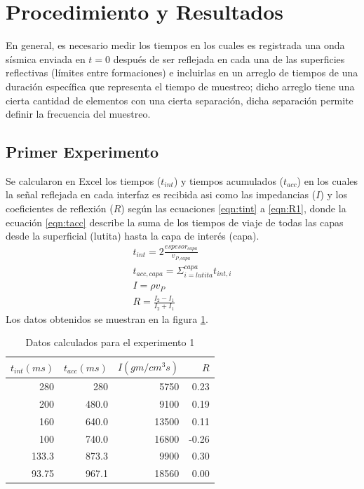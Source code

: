 \documentclass[%
 aip,
 jmp,%
 amsmath,amssymb,
 reprint,%
]{revtex4-1}
\begin{document}
\section{Procedimiento y Resultados}

En general, es necesario medir los tiempos en los cuales es registrada una onda sísmica enviada en $t=0$ después de ser reflejada en cada una de las superficies reflectivas (límites entre formaciones) e incluirlas en un arreglo de tiempos de una duración específica que representa el tiempo de muestreo; dicho arreglo tiene una cierta cantidad de elementos con una cierta separación, dicha separación permite definir la frecuencia del muestreo.

\subsection{Primer Experimento}
Se calcularon en Excel los tiempos ($t_{int}$) y tiempos acumulados ($t_{acc}$) en los cuales la señal reflejada en cada interfaz es recibida asi como las impedancias ($I$) y los coeficientes de reflexión ($R$) según las ecuaciones \ref{eqn:tint} a \ref{eqn:R1}, donde la ecuación \ref{eqn:tacc} describe la suma de los tiempos de viaje de todas las capas desde la superficial (lutita) hasta la capa de interés (capa).
\begin{eqnarray}
t_{int}=2\frac{espesor_{capa}}{v_{P, capa}}\\
\label{eqn:tint}
t_{acc, capa}=\Sigma_{i=lutita}^{capa}t_{int, i}\\
\label{eqn:tacc}
I=\rho v_P\\
\label{eqn:i1}
R=\frac{I_2-I_1}{I_2+I_1}
\label{eqn:R1}
\end{eqnarray}
Los datos obtenidos se muestran en la figura \ref{tab:tiemposExp1}.
\begin{table}[h]
	\centering
	\caption{Datos calculados para el experimento 1}
	\begin{tabular}{r|r|r|r}
		$t_{int}(ms)$ & $t_{acc}(ms)$ & $I (gm/cm^3s)$ & $R$ \\\hline
		280   & 280   & 5750  & 0.23 \\
		200   & 480.0 & 9100  & 0.19 \\
		160   & 640.0 & 13500 & 0.11 \\
		100   & 740.0 & 16800 & -0.26 \\
		133.3 & 873.3 & 9900  & 0.30 \\
		93.75 & 967.1 & 18560 & 0.00 \\
	\end{tabular}%
	\label{tab:tiemposExp1}%
\end{table}%
\end{document}
